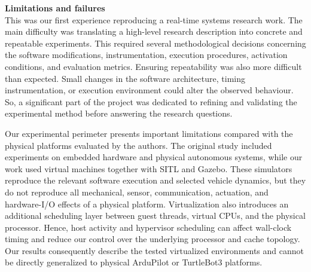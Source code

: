 \noindent \textbf{Limitations and failures} \\ 
\noindent This was our first experience reproducing a real-time systems research work. The main difficulty was translating a high-level research description into concrete and repeatable experiments. This required several methodological decisions concerning the software modifications, instrumentation, execution procedures, activation conditions, and evaluation metrics. Ensuring repeatability was also more difficult than expected. Small changes in the software architecture, timing instrumentation, or execution environment could alter the observed behaviour. So, a significant part of the project was dedicated to refining and validating the experimental method before answering the research questions.

\noindent Our experimental perimeter presents important limitations compared with the physical platforms evaluated by the authors. The original study included experiments on embedded hardware and physical autonomous systems, while our work used virtual machines together with SITL and Gazebo. These simulators reproduce the relevant software execution and selected vehicle dynamics, but they do not reproduce all mechanical, sensor, communication, actuation, and hardware-I/O effects of a physical platform. Virtualization also introduces an additional scheduling layer between guest threads, virtual CPUs, and the physical processor. Hence, host activity and hypervisor scheduling can affect wall-clock timing and reduce our control over the underlying processor and cache topology. Our results consequently describe the tested virtualized environments and cannot be directly generalized to physical ArduPilot or TurtleBot3 platforms.

